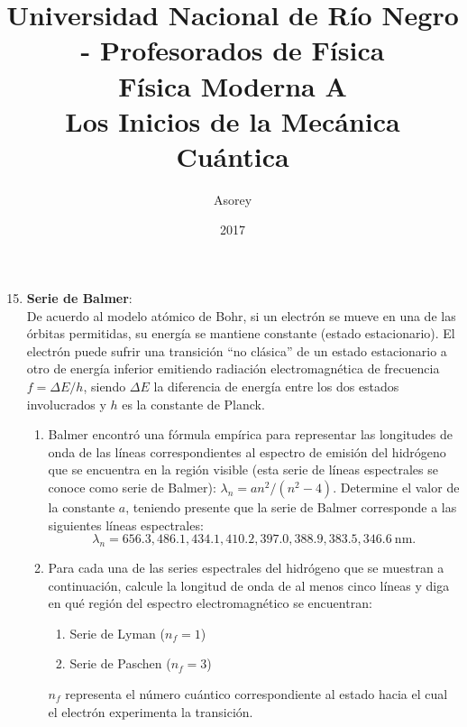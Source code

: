 \documentclass[a4paper,12pt]{article}
\begin{document}
\title{
{\normalsize{Universidad Nacional de Río Negro - Profesorados de Física}}\\
Física Moderna A \\ Los Inicios de la Mecánica Cuántica\\}
\author{Asorey}
\date{2017}
\maketitle

\begin{enumerate}
\setcounter{enumi}{14}      %

\item {\bf{Serie de Balmer}}:\\
	De acuerdo al modelo atómico de Bohr, si un electrón se mueve en una de las
		órbitas permitidas, su energía se mantiene constante (estado
		estacionario). El electrón puede sufrir una transición ``no clásica''
		de un estado estacionario a otro de energía inferior emitiendo
		radiación electromagnética de frecuencia $ f = \Delta E/h$, siendo
		$\Delta E$ la diferencia de energía entre los dos estados involucrados
		y $h$ es la constante de Planck.
	\begin{enumerate}
		\item Balmer encontró una fórmula empírica para representar las
			longitudes de onda de las líneas correspondientes al espectro de
			emisión del hidrógeno que se encuentra en la región visible (esta
			serie de líneas espectrales se conoce como serie de Balmer):
			$\lambda_n = a n^2 / (n^2 - 4)$. Determine el valor de la constante
			$a$, teniendo presente que la serie de Balmer corresponde a las
			siguientes líneas espectrales: $$\lambda_n=656.3, 486.1, 434.1,
			410.2, 397.0, 388.9, 383.5, 346.6\mathrm{\ nm.}$$
		\item Para cada una de las series espectrales del hidrógeno que se
			muestran a continuación, calcule la longitud de onda de al menos
			cinco líneas y diga en qué región del espectro electromagnético se
			encuentran:
			\begin{enumerate}
				\item Serie de Lyman ($n_f = 1$)
				\item Serie de Paschen ($n_f = 3$)
			\end{enumerate}
			$n_f$ representa el número cuántico correspondiente al estado hacia
			el cual el electrón experimenta la transición.
	\end{enumerate}


\end{enumerate}
\end{document}
